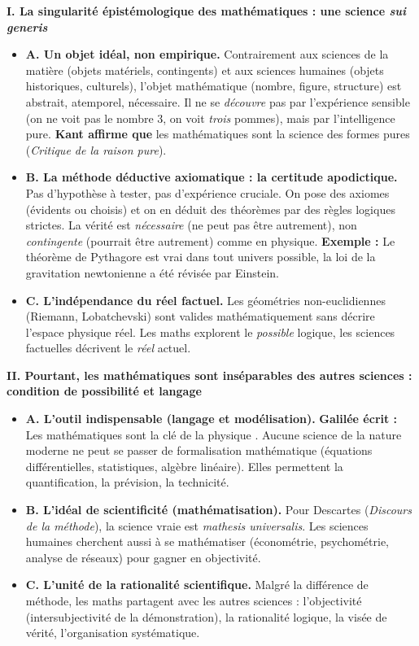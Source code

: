 \documentclass[11pt]{article}
\begin{document}
\begin{exoresolu}
    \textbf{I. La singularité épistémologique des mathématiques : une science \emph{sui generis}}
    \begin{itemize}
        \item \textbf{A. Un objet idéal, non empirique.} Contrairement aux sciences de la matière (objets matériels, contingents) et aux sciences humaines (objets historiques, culturels), l'objet mathématique (nombre, figure, structure) est abstrait, atemporel, nécessaire. Il ne se \emph{découvre} pas par l'expérience sensible (on ne voit pas le nombre 3, on voit \emph{trois} pommes), mais par l'intelligence pure. \textbf{Kant affirme que} les mathématiques sont la science des formes pures (\emph{Critique de la raison pure}).
        \item \textbf{B. La méthode déductive axiomatique : la certitude apodictique.} Pas d'hypothèse à tester, pas d'expérience cruciale. On pose des axiomes (évidents ou choisis) et on en déduit des théorèmes par des règles logiques strictes. La vérité est \emph{nécessaire} (ne peut pas être autrement), non \emph{contingente} (pourrait être autrement) comme en physique. \textbf{Exemple :} Le théorème de Pythagore est vrai dans tout univers possible, la loi de la gravitation newtonienne a été révisée par Einstein.
        \item \textbf{C. L'indépendance du réel factuel.} Les géométries non-euclidiennes (Riemann, Lobatchevski) sont valides mathématiquement sans décrire l'espace physique réel. Les maths explorent le \emph{possible} logique, les sciences factuelles décrivent le \emph{réel} actuel.
    \end{itemize}

    \textbf{II. Pourtant, les mathématiques sont inséparables des autres sciences : condition de possibilité et langage}
    \begin{itemize}
        \item \textbf{A. L'outil indispensable (langage et modélisation).} \textbf{Galilée écrit :} \guillemotleft Les mathématiques sont la clé de la physique \guillemotright. Aucune science de la nature moderne ne peut se passer de formalisation mathématique (équations différentielles, statistiques, algèbre linéaire). Elles permettent la quantification, la prévision, la technicité.
        \item \textbf{B. L'idéal de scientificité (mathématisation).} Pour Descartes (\emph{Discours de la méthode}), la science vraie est \emph{mathesis universalis}. Les sciences humaines cherchent aussi à se mathématiser (économétrie, psychométrie, analyse de réseaux) pour gagner en objectivité.
        \item \textbf{C. L'unité de la rationalité scientifique.} Malgré la différence de méthode, les maths partagent avec les autres sciences : l'objectivité (intersubjectivité de la démonstration), la rationalité logique, la visée de vérité, l'organisation systématique.
    \end{itemize}


\end{exoresolu}
\end{document}
